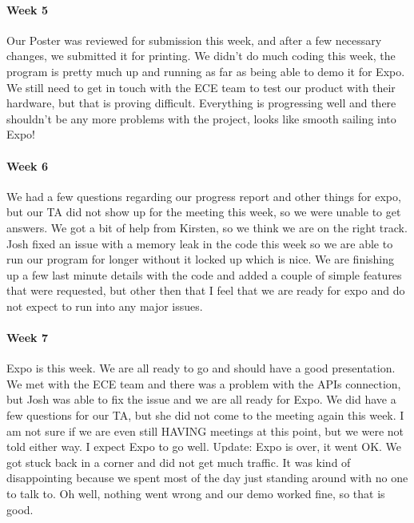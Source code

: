 \documentclass[10pt,draftclsnofoot,onecolumn,retainorgcmds]{IEEEtran}
\begin{document}
\paragraph{Week 5}
Our Poster was reviewed for submission this week, and after a few necessary changes, we submitted it for printing. We didn't do much coding this week, the program is pretty much up and running as far as being able to demo it for Expo. We still need to get in touch with the ECE team to test our product with their hardware, but that is proving difficult. Everything is progressing well and there shouldn't be any more problems with the project, looks like smooth sailing into Expo!\\
\paragraph{Week 6}
We had a few questions regarding our progress report and other things for expo, but our TA did not show up for the meeting this week, so we were unable to get answers. We got a bit of help from Kirsten, so we think we are on the right track. Josh fixed an issue with a memory leak in the code this week so we are able to run our program for longer without it locked up which is nice. We are finishing up a few last minute details with the code and added a couple of simple features that were requested, but other then that I feel that we are ready for expo and do not expect to run into any major issues.\\
\paragraph{Week 7}
Expo is this week. We are all ready to go and should have a good presentation. We met with the ECE team and there was a problem with the APIs connection, but Josh was able to fix the issue and we are all ready for Expo. We did have a few questions for our TA, but she did not come to the meeting again this week. I am not sure if we are even still HAVING meetings at this point, but we were not told either way. I expect Expo to go well. Update: Expo is over, it went OK. We got stuck back in a corner and did not get much traffic. It was kind of disappointing because we spent most of the day just standing around with no one to talk to. Oh well, nothing went wrong and our demo worked fine, so that is good.
\end{document}
